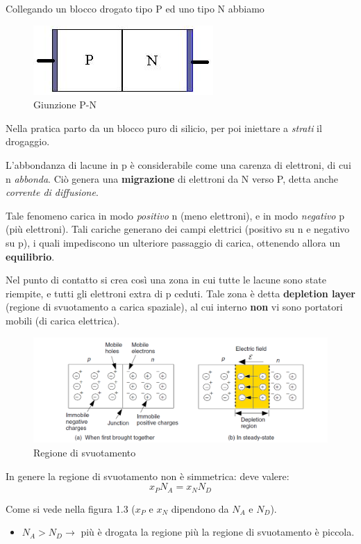 \documentclass[
]{book}
\providecommand{\tightlist}{%
  \setlength{\itemsep}{0pt}\setlength{\parskip}{0pt}}
\begin{document}
Collegando un blocco drogato tipo P ed uno tipo N abbiamo

\begin{figure}
\centering
\includegraphics[width=0.3\linewidth,height=\textheight,keepaspectratio]{immagini/0.jpg}
\caption{Giunzione P-N}
\end{figure}

Nella pratica parto da un blocco puro di silicio, per poi iniettare a
\emph{strati} il drogaggio.

L'abbondanza di lacune in p è considerabile come una carenza di
elettroni, di cui n \emph{abbonda}. Ciò genera una \textbf{migrazione}
di elettroni da N verso P, detta anche \emph{corrente di diffusione}.

Tale fenomeno carica in modo \emph{positivo} n (meno elettroni), e in
modo \emph{negativo} p (più elettroni). \newline Tali cariche generano
dei campi elettrici (positivo su n e negativo su p), i quali impediscono
un ulteriore passaggio di carica, ottenendo allora un
\textbf{equilibrio}.

Nel punto di contatto si crea così una zona in cui tutte le lacune sono
state riempite, e tutti gli elettroni extra di p ceduti. Tale zona è
detta \textbf{depletion layer} (regione di svuotamento a carica
spaziale), al cui interno \textbf{non} vi sono portatori mobili (di
carica elettrica).

\begin{figure}
\centering
\includegraphics[width=0.68\linewidth,height=\textheight,keepaspectratio]{immagini/1.png}
\caption{Regione di svuotamento}
\end{figure}

In genere la regione di svuotamento non è simmetrica: deve valere: \[
x_P N_A = x_N N_D
\]

Come si vede nella figura 1.3 (\(x_P\) e \(x_N\) dipendono da \(N_A\) e
\(N_D\)).

\begin{itemize}
\tightlist
\item
  \(N_A > N_D \to\) più è drogata la regione più la regione di
  svuotamento è piccola.
\end{itemize}
\end{document}
